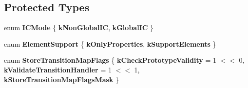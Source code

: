 \subsection*{Protected Types}
\begin{DoxyCompactItemize}
\item 
\mbox{\label{classv8_1_1internal_1_1AccessorAssembler_ab680069b3f903c5909b50e8f70826da1}} 
enum {\bfseries I\+C\+Mode} \{ {\bfseries k\+Non\+Global\+IC}, 
{\bfseries k\+Global\+IC}
 \}
\item 
\mbox{\label{classv8_1_1internal_1_1AccessorAssembler_a59966ccd362f71285c76c4d7a981921c}} 
enum {\bfseries Element\+Support} \{ {\bfseries k\+Only\+Properties}, 
{\bfseries k\+Support\+Elements}
 \}
\item 
\mbox{\label{classv8_1_1internal_1_1AccessorAssembler_a5b45e778221700bc7a06663e55c48912}} 
enum {\bfseries Store\+Transition\+Map\+Flags} \{ {\bfseries k\+Check\+Prototype\+Validity} = 1 $<$$<$ 0, 
{\bfseries k\+Validate\+Transition\+Handler} = 1 $<$$<$ 1, 
{\bfseries k\+Store\+Transition\+Map\+Flags\+Mask}
 \}
\end{DoxyCompactItemize}

